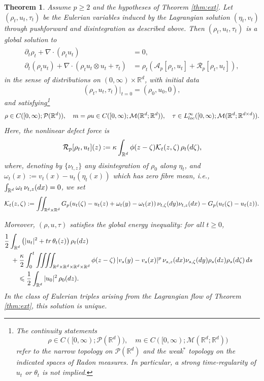 \documentclass[10pt,a4paper]{amsart}
\newtheorem{theorem}{Theorem}
\newcommand{\R}{\mathbb R}
\newcommand{\bq}{\begin{equation}}
\newcommand{\calA}{\mathcal A}
\newcommand{\calK}{\mathcal K}
\newcommand{\calM}{\mathcal M}
\newcommand{\calP}{\mathcal P}
\newcommand{\calR}{\mathcal R}
\newcommand{\ds}{\textnormal{d}s}
\newcommand{\dx}{\textnormal{d}x}
\newcommand{\dy}{\textnormal{d}y}
\newcommand{\dz}{\textnormal{d}z}
\newcommand{\eq}{\end{equation}}
\renewcommand{\geq}{\geqslant}
\newcommand{\intr}{\int_{\R^d}}
\newcommand{\intrr}{\iint_{\R^d \times \R^d}}
\renewcommand{\le}{\leqslant}
\newcommand{\lt}{\left}
\newcommand{\pa}{\partial}
\newcommand{\rd}{\textnormal{d}}
\newcommand{\rt}{\right}
\begin{document}
\begin{theorem} \label{thm:ERA}
Assume $p \geq 2$ and the hypotheses of Theorem \ref{thm:ext}. Let $(\rho_t, u_t, \tau_t)$ be the Eulerian variables induced by the Lagrangian solution $(\eta_t,v_t)$ through pushforward and disintegration as described above. Then $(\rho_t, u_t, \tau_t)$ is a global solution to 
\begin{align}\label{eq:ERA}
\begin{aligned}
\pa_t\rho_t+\nabla \cdot(\rho_t u_t)&=0, \\
\pa_t(\rho_t u_t)+\nabla \cdot(\rho_t u_t\otimes u_t + \tau_t)
&=\rho_t\lt(\calA_p[\rho_t,u_t]+\calR_p[\rho_t,u_t]\rt), 
\end{aligned}
\end{align}
in the sense of distributions on $(0,\infty)\times\R^d$, with initial data 
\[
(\rho_t, u_t, \tau_t)|_{t=0} = (\rho_0, u_0, 0),
\]
and satisfying\footnote{The continuity statements 
\[
\rho\in C([0,\infty);\calP(\R^d)),\quad
m\in C([0,\infty);\calM(\R^d;\R^d)) 
\]
refer to the narrow topology on $\calP(\R^d)$ and the weak$^\ast$
topology on the indicated spaces of Radon measures. In particular, a strong time-regularity of $u_t$ or $\theta_t$ is not implied.
}
\[
\rho \in C([0,\infty);\calP(\R^d)),\quad m=\rho u \in C([0,\infty);\calM(\R^d;\R^d)), \quad \tau \in L^\infty_{\rm loc}([0,\infty);\calM(\R^d;\R^{d \times d})).
\]
Here, the nonlinear defect force is
\[
\calR_p[\rho_t,u_t](z) :=\kappa\intr\phi(z-\zeta) \calK_t(z,\zeta)\,\rho_t(\rd\zeta),
\]
where, denoting by $\{\nu_{t,z}\}$ any disintegration of $\rho_0$ along $\eta_t$, and $\omega_t(x):=v_t(x)-u_t(\eta_t(x))$ which has zero fibre mean, i.e., $\intr \omega_t\,\nu_{t,z}(\dx)=0$, we set
\bq\label{calK}
\calK_t(z,\zeta) := \intrr   G_p(u_t(\zeta)-u_t(z)+\omega_t(y)-\omega_t(x)) \,\nu_{t,\zeta}(\dy) \nu_{t,z}(\dx) - G_p(u_t(\zeta)-u_t(z)).
\eq

Moreover, $(\rho,u,\tau)$ satisfies the global energy inequality:
for all $t\geq 0$,
\begin{align}\label{ERA_energy}
\begin{aligned}
&\frac12 \intr \left(|u_t|^2+{\rm tr}\,\theta_t(z)\right)\rho_t(\dz)\cr
&\quad +\frac{\kappa}{2} \int_0^t\iiiint_{\R^d \times \R^d \times \R^d \times \R^d} \phi(z-\zeta)\,|v_s(y)-v_s(x)|^p \,\nu_{s,z}(\dx)\nu_{s,\zeta}(\dy) \rho_s(\dz)\rho_s(\rd\zeta)\, \ds \cr
&\qquad \le \frac12\intr |u_0|^2 \,\rho_0(\dz).
\end{aligned}
\end{align}
In the class of Eulerian triples arising from the Lagrangian flow of Theorem \ref{thm:ext}, this solution is unique.
\end{theorem}
\end{document}
